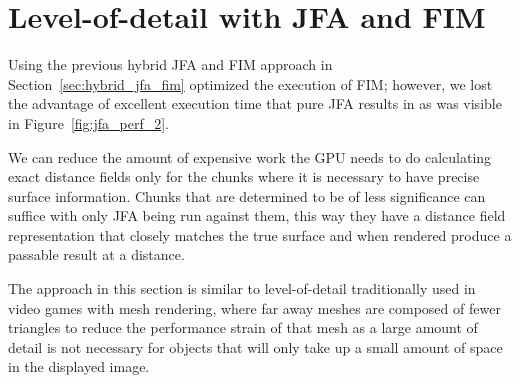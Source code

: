\begin{table}[h]
    \centering
    \caption{Distance field compute shader execution time using hybrid JFA and FIM approach. Compared against a pure
        FIM execution.}
    \label{tab:hybrid_jfa_fim_perf}
\end{table}

\section{Level-of-detail with JFA and FIM} \label{sec:lod_jfa_fim}
Using the previous hybrid JFA and FIM approach in Section~\ref{sec:hybrid_jfa_fim} optimized the execution of FIM;
however, we lost the advantage of excellent execution time that pure JFA results in as was visible in
Figure~\ref{fig:jfa_perf_2}.

We can reduce the amount of expensive work the GPU needs to do calculating exact distance fields only for the chunks
where it is necessary to have precise surface information. Chunks that are determined to be of less significance can
suffice with only JFA being run against them, this way they have a distance field representation that closely matches
the true surface and when rendered produce a passable result at a distance.

The approach in this section is similar to level-of-detail traditionally used in video games with mesh rendering, where
far away meshes are composed of fewer triangles to reduce the performance strain of that mesh as a large amount of
detail is not necessary for objects that will only take up a small amount of space in the displayed image.

